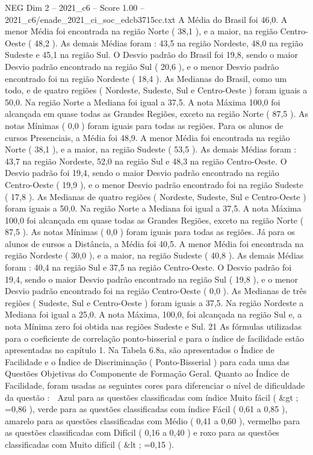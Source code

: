 \begin{textsample}{NEG Dim 2 – 2021\_c6 – Score 1.00 – 2021\_c6/enade\_2021\_ci\_soc\_edcb3715cc.txt}
A Média do Brasil foi 46,0.
A menor Média foi encontrada na região Norte ( 38,1 ), e a maior, na região Centro-Oeste ( 48,2 ).
As demais Médias foram : 43,5 na região Nordeste, 48,0 na região Sudeste e 45,1 na região Sul.
O Desvio padrão do Brasil foi 19,8, sendo o maior Desvio padrão encontrado na região Sul ( 20,6 ), e o menor Desvio padrão encontrado foi na região Nordeste ( 18,4 ).
As Medianas do Brasil, como um todo, e de quatro regiões ( Nordeste, Sudeste, Sul e Centro-Oeste ) foram iguais a 50,0.
Na região Norte a Mediana foi igual a 37,5.
A nota Máxima 100,0 foi alcançada em quase todas as Grandes Regiões, exceto na região Norte ( 87,5 ).
As notas Mínimas ( 0,0 ) foram iguais para todas as regiões.
Para os alunos de cursos Presenciais, a Média foi 48,9.
A menor Média foi encontrada na região Norte ( 38,1 ), e a maior, na região Sudeste ( 53,5 ).
As demais Médias foram : 43,7 na região Nordeste, 52,0 na região Sul e 48,3 na região Centro-Oeste.
O Desvio padrão foi 19,4, sendo o maior Desvio padrão encontrado na região Centro-Oeste ( 19,9 ), e o menor Desvio padrão encontrado foi na região Sudeste ( 17,8 ).
As Medianas de quatro regiões ( Nordeste, Sudeste, Sul e Centro-Oeste ) foram iguais a 50,0.
Na região Norte a Mediana foi igual a 37,5.
A nota Máxima 100,0 foi alcançada em quase todas as Grandes Regiões, exceto na região Norte ( 87,5 ).
As notas Mínimas ( 0,0 ) foram iguais para todas as regiões.
Já para os alunos de cursos a Distância, a Média foi 40,5.
A menor Média foi encontrada na região Nordeste ( 30,0 ), e a maior, na região Sudeste ( 40,8 ).
As demais Médias foram : 40,4 na região Sul e 37,5 na região Centro-Oeste.
O Desvio padrão foi 19,4, sendo o maior Desvio padrão encontrado na região Sul ( 19,8 ), e o menor Desvio padrão encontrado foi na região Centro-Oeste ( 0,0 ).
As Medianas de três regiões ( Sudeste, Sul e Centro-Oeste ) foram iguais a 37,5.
Na região Nordeste a Mediana foi igual a 25,0.
A nota Máxima, 100,0, foi alcançada na região Sul e, a nota Mínima zero foi obtida nas regiões Sudeste e Sul. 21 As fórmulas utilizadas para o coeficiente de correlação ponto-bisserial e para o índice de facilidade estão apresentadas no capítulo 1.
Na Tabela 6.8a, são apresentados o Índice de Facilidade e o Índice de Discriminação ( Ponto-Bisserial ) para cada uma das Questões Objetivas do Componente de Formação Geral.
Quanto ao Índice de Facilidade, foram usadas as seguintes cores para diferenciar o nível de dificuldade da questão :  Azul para as questões classificadas com índice Muito fácil ( \&gt ; =0,86 ), verde para as questões classificadas com índice Fácil ( 0,61 a 0,85 ), amarelo para as questões classificadas com Médio ( 0,41 a 0,60 ), vermelho para as questões classificadas com Difícil ( 0,16 a 0,40 ) e roxo para as questões classificadas com Muito difícil ( \&lt ; =0,15 ).

\end{textsample}

